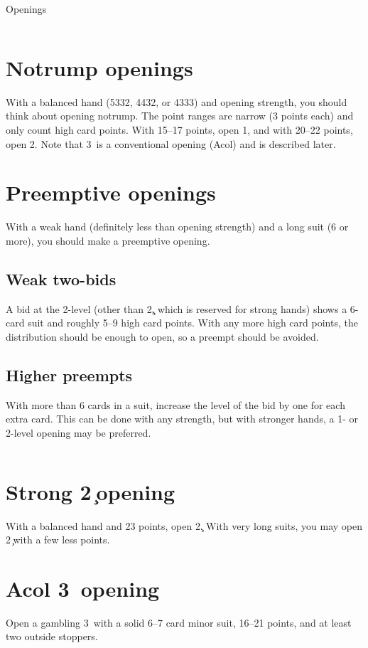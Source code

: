 \begin{sheet}{Openings}
\begin{columns}
\begin{column}[span=5]
\section{Notrump openings}
With a balanced hand (5332, 4432, or 4333) and opening strength, you should
think about opening notrump.  The point ranges are narrow (3 points each)
and only count high card points.  With 15--17 points, open 1\nt, and with
20--22 points, open 2\nt.  Note that 3\nt\ is a conventional opening (Acol)
and is described later.

\section{Preemptive openings}
With a weak hand (definitely less than opening strength) and a long suit
(6 or more), you should make a preemptive opening.
\subsection{Weak two-bids}
A bid at the 2-level (other than 2\c, which is reserved for strong hands)
shows a 6-card suit and roughly 5--9 high card points.  With any more high
card points, the distribution should be enough to open, so a preempt should
be avoided.
\subsection{Higher preempts}
With more than 6 cards in a suit, increase the level of the bid by one
for each extra card.  This can be done with any strength, but with stronger
hands, a 1- or 2-level opening may be preferred.
\end{column}
\end{columns}

\begin{columns}{11}

\begin{column}[span=6]
\section*{Strong 2\c\ opening}
With a balanced hand and 23 points, open 2\c.  With very long suits,
you may open 2\c\ with a few less points.

\section*{Acol 3\nt\ opening}
Open a gambling 3\nt\ with a solid 6--7 card minor suit, 16--21 points,
and at least two outside stoppers.
\end{column}


\end{columns}
\end{sheet}
